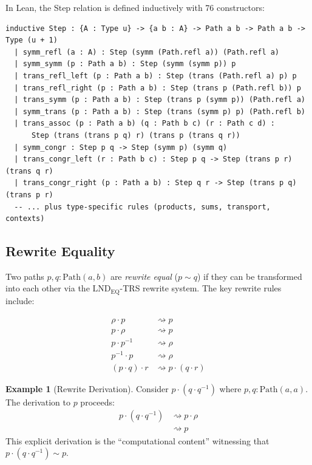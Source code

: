 \documentclass{lmcs}
\theoremstyle{definition}
\newtheorem{example}[definition]{Example}
\theoremstyle{plain}
\theoremstyle{remark}
\newcommand{\refl}{\rho}
\newcommand{\Rw}{\rightsquigarrow}
\newcommand{\RwEq}{\sim}
\newcommand{\Path}{\mathrm{Path}}
\begin{document}
In Lean, the Step relation is defined inductively with 76 constructors:
\begin{lstlisting}
inductive Step : {A : Type u} -> {a b : A} -> Path a b -> Path a b -> Type (u + 1)
  | symm_refl (a : A) : Step (symm (Path.refl a)) (Path.refl a)
  | symm_symm (p : Path a b) : Step (symm (symm p)) p
  | trans_refl_left (p : Path a b) : Step (trans (Path.refl a) p) p
  | trans_refl_right (p : Path a b) : Step (trans p (Path.refl b)) p
  | trans_symm (p : Path a b) : Step (trans p (symm p)) (Path.refl a)
  | symm_trans (p : Path a b) : Step (trans (symm p) p) (Path.refl b)
  | trans_assoc (p : Path a b) (q : Path b c) (r : Path c d) :
      Step (trans (trans p q) r) (trans p (trans q r))
  | symm_congr : Step p q -> Step (symm p) (symm q)
  | trans_congr_left (r : Path b c) : Step p q -> Step (trans p r) (trans q r)
  | trans_congr_right (p : Path a b) : Step q r -> Step (trans p q) (trans p r)
  -- ... plus type-specific rules (products, sums, transport, contexts)
\end{lstlisting}

\subsection{Rewrite Equality}

Two paths $p, q : \Path(a, b)$ are \emph{rewrite equal} ($p \RwEq q$) if they can be transformed into each other via the $\mathrm{LND}_{\mathrm{EQ}}$-TRS rewrite system. The key rewrite rules include:

\begin{align}
\refl \cdot p &\Rw p \tag{left unit} \\
p \cdot \refl &\Rw p \tag{right unit} \\
p \cdot p^{-1} &\Rw \refl \tag{right inverse} \\
p^{-1} \cdot p &\Rw \refl \tag{left inverse} \\
(p \cdot q) \cdot r &\Rw p \cdot (q \cdot r) \tag{associativity}
\end{align}

\begin{example}[Rewrite Derivation]
\label{ex:rewrite}
Consider $p \cdot (q \cdot q^{-1})$ where $p, q : \Path(a, a)$. The derivation to $p$ proceeds:
\begin{align*}
p \cdot (q \cdot q^{-1})
&\Rw p \cdot \refl \tag{right inverse} \\
&\Rw p \tag{right unit}
\end{align*}
This explicit derivation is the ``computational content'' witnessing that $p \cdot (q \cdot q^{-1}) \RwEq p$.
\end{example}
\end{document}
